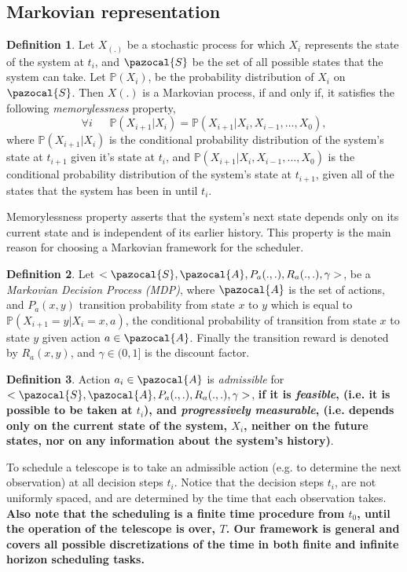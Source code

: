\documentclass[12pt]{aastex62}
\theoremstyle{definition}
\newtheorem{defn}{Definition}
\begin{document}
\subsection{Markovian representation}\label{sec_Markov}
\begin{defn}
Let $X_{(.)}$ be a stochastic process for which $X_i$ represents the state of the system at $t_i$, and $\pazocal{S}$ be the set of all possible states that the system can take. Let $\mathbb{P}(X_i)$, be the probability distribution of $X_i$ on $\pazocal{S}$. Then $X(.)$ is a Markovian process, if and only if, it satisfies the following \textit{memorylessness} property,
\begin{equation*}
\forall i ~~~~~~~\mathbb{P}(X_{{i+1}} | X_{i}) = \mathbb{P}(X_{{i+1}} | X_{i}, X_{{i-1}},\dots, X_{0}),
\end{equation*}
where $\mathbb{P}(X_{{i+1}} | X_{i})$ is the conditional probability distribution of the system's state at $t_{i+1}$ given it's state at $t_i$, and $\mathbb{P}(X_{{i+1}} | X_{i}, X_{{i-1}},\dots, X_{0})$ is the conditional probability distribution of the system's state at $t_{i+1}$, given all of the states that the system has been in until $t_i$.
\end{defn}
Memorylessness property asserts that the system's next state depends only on its current state and is independent of its earlier history. This property is the main reason for choosing a Markovian framework for the scheduler. 
\begin{defn}
Let $<\pazocal{S},\pazocal{A}, P_a(.,.), R_a(.,.), \gamma>$, be a \textit{Markovian Decision Process (MDP)}, where $\pazocal{A}$ is the set of actions, and $P_a(x, y)$ transition probability from state $x$ to $y$ which is equal to $\mathbb{P}(X_{i+1}=y | X_i=x, a)$, the conditional probability of transition from state $x$ to state $y$ given action $a \in  \pazocal{A}$. Finally the transition reward is denoted by $R_a(x,y)$, and $\gamma \in (0,1]$ is the discount factor.
\end{defn}
\begin{defn}
Action $a_{i} \in \pazocal{A}$ is \textit{admissible} for $<\pazocal{S},\pazocal{A}, P_a(.,.), R_a(.,.), \gamma>$, {\bf if it is \textit{feasible}, (i.e. it is possible to be taken at $t_i$), and \textit{progressively measurable}, (i.e. depends only on the current state of the system, $X_i$, neither on the future states, nor on any information about the system's history)\bf}.
\end{defn}
To schedule a telescope is to take an admissible action (e.g. to determine the next observation) at all decision steps $t_i$. Notice that the decision steps $t_i$, are not uniformly spaced, and are determined by the time that each observation takes. {\bf Also note that the scheduling is a finite time procedure from $t_0$, until the operation of the telescope is over, $T$. Our framework is general and covers all possible discretizations of the time in both finite and infinite horizon scheduling tasks.\bf}
\end{document}
